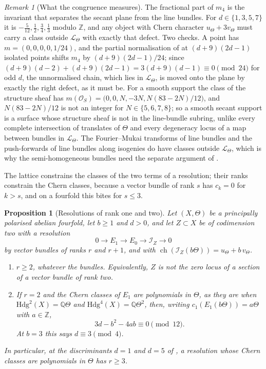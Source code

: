 \documentclass[11pt,reqno]{amsart}
\theoremstyle{plain}
\newtheorem{proposition}[theorem]{Proposition}
\theoremstyle{definition}
\theoremstyle{remark}
\newtheorem{remark}[theorem]{Remark}
\newcommand{\QQ}{\mathbb{Q}}
\newcommand{\ZZ}{\mathbb{Z}}
\newcommand{\cO}{\mathcal{O}}
\newcommand{\cL}{\mathcal{L}}
\newcommand{\cI}{\mathcal{I}}
\newcommand{\Hdg}{\mathrm{Hdg}}
\DeclareMathOperator{\ch}{ch}
\begin{document}
\begin{remark}[What the congruence measures]\label{rem:latticedefect}
The fractional part of $m_{4}$ is the invariant that separates the secant
plane from the line bundles. For $d\in\{1,3,5,7\}$ it is
$-\tfrac{5}{12},\tfrac12,\tfrac34,\tfrac13$ modulo $\ZZ$, and any object with
Chern character $u_{\Theta}+3v_{\Theta}$ must carry a class outside
$\cL_{\Theta}$ with exactly that defect. Two checks. A point has
$m=(0,0,0,0,1/24)$, and the partial normalisation of  at
$(d+9)(2d-1)$ isolated points shifts $m_{4}$ by $(d+9)(2d-1)/24$; since
$(d+9)(d-2)+(d+9)(2d-1)=3(d+9)(d-1)\equiv0\pmod{24}$ for odd $d$, the
unnormalised chain, which lies in $\cL_{\Theta}$, is moved onto the plane by
exactly the right defect, as it must be. For a smooth support the class of
the structure sheaf has $m(\cO_{S})=\bigl(0,0,N,-3N,N(83-2N)/12\bigr)$, and
$N(83-2N)/12$ is not an integer for $N\in\{5,6,7,8\}$; so a smooth secant
support is a surface whose structure sheaf is not in the line-bundle
subring, unlike every complete intersection of translates of $\Theta$ and
every degeneracy locus of a map between bundles in $\cL_{\Theta}$. The
Fourier--Mukai transforms of line bundles and the push-forwards of line
bundles along isogenies do have classes outside $\cL_{\Theta}$, which is why
the semi-homogeneous bundles need the separate argument of
.
\end{remark}

The lattice constrains the classes of the two terms of a resolution; their
ranks constrain the Chern classes, because a vector bundle of rank $s$ has
$c_{k}=0$ for $k>s$, and on a fourfold this bites for $s\le3$.

\begin{proposition}[Resolutions of rank one and two]\label{prop:lowrankburch}
Let $(X,\Theta)$ be a principally polarised abelian fourfold, let $b\ge1$
and $d>0$, and let $Z\subset X$ be of codimension two with a resolution
\[
  0\longrightarrow E_{1}\longrightarrow E_{0}\longrightarrow\cI_{Z}
  \longrightarrow0
\]
by vector bundles of ranks $r$ and $r+1$, and with
$\ch(\cI_{Z}(b\Theta))=u_{\Theta}+b\,v_{\Theta}$.
\begin{enumerate}[label=\textup{(\roman*)},nosep,leftmargin=2.2em]
\item $r\ge2$, whatever the bundles. Equivalently, $Z$ is not the zero locus
  of a section of a vector bundle of rank two.
\item If $r=2$ and the Chern classes of $E_{1}$ are polynomials in $\Theta$,
  as they are when $\Hdg^{2}(X)=\QQ\Theta$ and $\Hdg^{4}(X)=\QQ\Theta^{2}$,
  then, writing $c_{1}(E_{1}(b\Theta))=a\Theta$ with $a\in\ZZ$,
  \[
    3d-b^{2}-4ab\equiv0\pmod{12}.
  \]
  At $b=3$ this says $d\equiv3\pmod4$.
\end{enumerate}
In particular, at the discriminants $d=1$ and $d=5$ of
, a resolution whose Chern classes are
polynomials in $\Theta$ has $r\ge3$.
\end{proposition}
\end{document}
